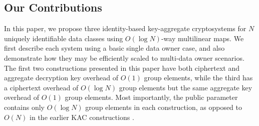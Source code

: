 \subsection{Our Contributions}
\label{subsec:contributions}

In this paper, we propose three identity-based key-aggregate cryptosystems for $N$ uniquely identifiable data classes using $O(\log N)$-way multilinear maps. We first describe each system using a basic single data owner case, and also demonstrate how they may be efficiently scaled to multi-data owner scenarios. The first two constructions presented in this paper have both ciphertext and aggregate decryption key overhead of $O(1)$ group elements, while the third has a ciphertext overhead of $O(\log N)$ group elements but the same aggregate key overhead of $O(1)$ group elements. Most importantly, the public parameter contains only $O(\log N)$ group elements in each construction, as opposed to $O(N)$ in the earlier KAC constructions \cite{chu2014key,patranabis2015dynamic}. 

\let\labelitemi\labelitemii

